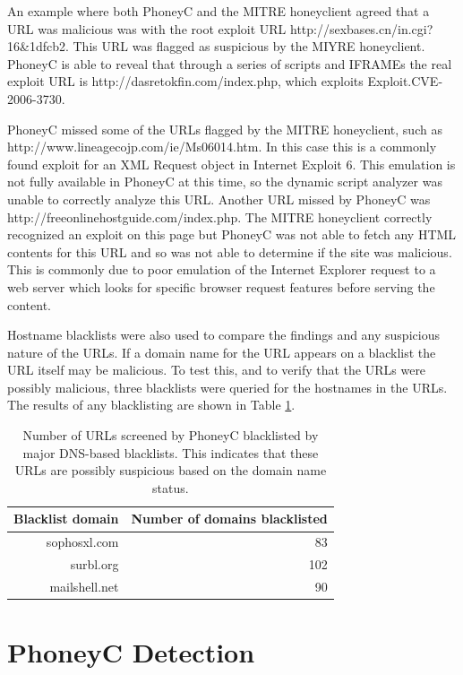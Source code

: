 \documentclass[10pt,twocolumn]{article}
\begin{document}
An example where both PhoneyC and the MITRE honeyclient agreed that a URL was malicious was with the root exploit URL http://sexbases.cn/in.cgi?16\&1dfcb2. This URL was flagged as suspicious by the MIYRE honeyclient. PhoneyC is able to reveal that through a series of scripts and IFRAMEs the real exploit URL is http://dasretokfin.com/index.php, which exploits Exploit.CVE-2006-3730. 

PhoneyC missed some of the URLs flagged by the MITRE honeyclient, such as http://www.lineagecojp.com/ie/Ms06014.htm. In this case this is a commonly found exploit for an XML Request object in Internet Exploit 6. This emulation is not fully available in PhoneyC at this time, so the dynamic script analyzer was unable to correctly analyze this URL. Another URL missed by PhoneyC was http://freeonlinehostguide.com/index.php. The MITRE honeyclient correctly recognized an exploit on this page but PhoneyC was not able to fetch any HTML contents for this URL and so was not able to determine if the site was malicious. This is commonly due to poor emulation of the Internet Explorer request to a web server which looks for specific browser request features before serving the content. 

Hostname blacklists were also used to compare the findings and any suspicious nature of the URLs. If a domain name for the URL appears on a blacklist the URL itself may be malicious. To test this, and to verify that the URLs were possibly malicious, three blacklists were queried for the hostnames in the URLs. The results of any blacklisting are shown in Table \ref{blacklist}. 

\begin{table}
\centering
\begin{tabular}{r|r}
\hline
{\bf Blacklist domain} & {Number of domains blacklisted} \\
\hline
sophosxl.com & 83 \\
surbl.org & 102 \\
mailshell.net & 90 \\ 
\hline
\end{tabular}
\bigskip
\scriptsize
\caption{Number of URLs screened by PhoneyC blacklisted by major DNS-based blacklists. This indicates that these URLs are possibly suspicious based on the domain name status.}
\normalsize
\bigskip
\label{blacklist}
\end{table}
\section{PhoneyC Detection}
\label{weaknesses}
\end{document}

